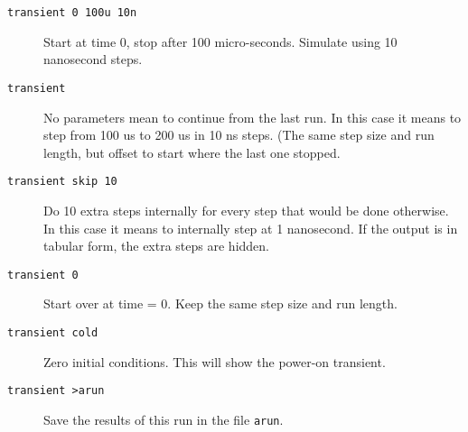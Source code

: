 \begin{description}

\item[{\tt transient 0 100u 10n}] Start at time 0, stop after
100 micro-seconds.  Simulate using 10 nanosecond steps.

\item[{\tt transient}] No parameters mean to continue from the last run.  In
this case it means to step from 100 us to 200 us in 10 ns steps.  (The same
step size and run length, but offset to start where the last one stopped.

\item[{\tt transient skip 10}] Do 10 extra steps internally for every step
that would be done otherwise.  In this case it means to internally step at 1
nanosecond.  If the output is in tabular form, the extra steps are hidden.

\item[{\tt transient 0}] Start over at time = 0.  Keep the same
step size and run length.

\item[{\tt transient cold}] Zero initial conditions.  This will
show the power-on transient.

\item[{\tt transient >arun}] Save the results of this run in
the file {\tt arun}.


\end{description}
